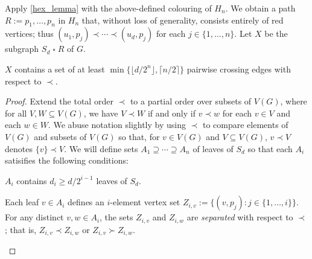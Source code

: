 \documentclass[kpfonts]{patmorin}
\renewcommand{\ge}{\geqslant}
\newcommand{\CartProd}{\mathbin{\square}}
\providecommand{\DIFadd}[1]{{\protect\color{blue}\uwave{#1}}} %
\providecommand{\DIFdel}[1]{{\protect\color{red}\sout{#1}}}                      %
\providecommand{\DIFaddbegin}{} %
\providecommand{\DIFaddend}{} %
\providecommand{\DIFdelbegin}{} %
\providecommand{\DIFdelend}{} %
\newcommand{\DIFscaledelfig}{0.5}
\newlength{\DIFdelgraphicswidth} %
\newlength{\DIFdelgraphicsheight} %
\newcommand{\DIFaddincludegraphics}[2][]{{\color{blue}\fbox{\DIFOincludegraphics[#1]{#2}}}} %
\newcommand{\DIFdelincludegraphics}[2][]{%
\sbox{\DIFdelgraphicsbox}{\DIFOincludegraphics[#1]{#2}}%
\settoboxwidth{\DIFdelgraphicswidth}{\DIFdelgraphicsbox} %
\settoboxtotalheight{\DIFdelgraphicsheight}{\DIFdelgraphicsbox} %
\scalebox{\DIFscaledelfig}{%
\parbox[b]{\DIFdelgraphicswidth}{\usebox{\DIFdelgraphicsbox}\\[-\baselineskip] \rule{\DIFdelgraphicswidth}{0em}}\llap{\resizebox{\DIFdelgraphicswidth}{\DIFdelgraphicsheight}{%
\setlength{\unitlength}{\DIFdelgraphicswidth}%
\begin{picture}(1,1)%
\thicklines\linethickness{2pt} %
{\color[rgb]{1,0,0}\put(0,0){\framebox(1,1){}}}%
{\color[rgb]{1,0,0}\put(0,0){\line( 1,1){1}}}%
{\color[rgb]{1,0,0}\put(0,1){\line(1,-1){1}}}%
\end{picture}%
}\hspace*{3pt}}} %
} %
\DeclareRobustCommand{\DIFaddbegin}{\DIFOaddbegin \let\includegraphics\DIFaddincludegraphics} %
\DeclareRobustCommand{\DIFaddend}{\DIFOaddend \let\includegraphics\DIFOincludegraphics} %
\DeclareRobustCommand{\DIFdelbegin}{\DIFOdelbegin \let\includegraphics\DIFdelincludegraphics} %
\DeclareRobustCommand{\DIFdelend}{\DIFOaddend \let\includegraphics\DIFOincludegraphics} %
\begin{document}
Apply \cref{hex_lemma} with the above-defined colouring of $H_n$. We obtain a path \DIFdelbegin \DIFdel{$R:=p_1,\ldots,p_n$ }\DIFdelend \DIFaddbegin \DIFadd{$P:=p_1,\ldots,p_n$ }\DIFaddend in $H_n$ that, without loss of generality, consists entirely of red vertices;
thus $(u_1,p_j)\prec\cdots\prec (u_d,p_j)$ for each $j\in\{1,\ldots,n\}$.  Let $X$ be the subgraph \DIFdelbegin \DIFdel{$S_d \CartProd R$ }\DIFdelend \DIFaddbegin \DIFadd{$S_d \CartProd P$ }\DIFaddend of $G$.

\begin{lem}\label{twister}
$X$ contains a set of at least $\min\{\lfloor d/2^{n}\rfloor,\lceil n/2\rceil\}$ pairwise crossing edges with respect to $\prec$.
\end{lem}

\begin{proof}
	Extend the total order $\prec$ to a partial order over subsets of $V(G)$, where for all $V,W\subseteq V(G)$, we have $V\prec W$ if and only if $v\prec w$ for each $v\in V$ and each $w\in W$.  We abuse notation slightly by using $\prec$ to compare elements of $V(G)$ and subsets of $V(G)$ so that, for $v\in V(G)$ and $V\subseteq V(G)$, $v\prec V$ denotes $\{v\}\prec V$.
    We will define sets $A_1\supseteq \cdots\supseteq A_{n}$ of leaves of $S_d$ so that each $A_i$ satisifies the following conditions:
    \begin{compactenum}[(C1)]
        \item $A_i$ contains $d_i\ge d/2^{i-1}$ leaves of $S_d$.
        \item Each leaf $v\in A_i$ defines an $i$-element vertex set $Z_{i,v}:=\{(v,p_j):j\in\{1,\ldots,i\}\}$.  For any distinct $v,w\in A_i$, the sets $Z_{i,v}$ and $Z_{i,w}$ are \emph{separated} with respect to $\prec$; that is, $Z_{i,v}\prec Z_{i,w}$ or $Z_{i,v}\succ Z_{i,w}$.
    \end{compactenum}


\end{proof}
\end{document}
